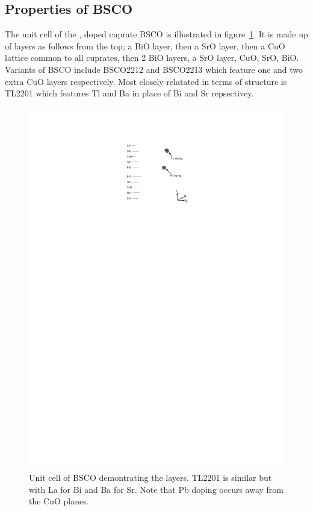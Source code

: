 
\subsection{Properties of \acs{BSCO}}

The unit cell of the \highTc, doped cuprate \acf{BSCO} is illustrated in figure~\ref{Fig:Intro:BSCOUnitCell}. It is made up of layers as follows from the top; a BiO layer, then a SrO layer, then a CuO lattice common to all cuprates, then 2 BiO layers, a SrO layer, CuO, SrO, BiO. Variants of \acs{BSCO} include \ac{BSCO2212} and \ac{BSCO2213} which feature one and two extra CuO layers respectively. Most closely relatated in terms of structure is \acs{TL2201} which features Tl and Ba in place of Bi and Sr repsectivey.
\begin{figure}[htbp]
    \begin{center}
        \includegraphics[scale=1.1]{Chapter-Introduction/Figures/BSCOUnitCell/BSCOUnitCell}
        \caption{Unit cell of \acs{BSCO} demontrating the layers. \ac{TL2201} is similar but with La for Bi and Ba for Sr. Note that Pb doping occurs away from the CuO planes.}
        \label{Fig:Intro:BSCOUnitCell}
    \end{center}
\end{figure}

